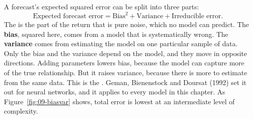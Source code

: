 A forecast's expected squared error can be split into three parts:
\begin{equation}
  \text{Expected forecast error} = \text{Bias}^2 + \text{Variance} + \text{Irreducible error}.
  \label{eq:20-biasvar}
\end{equation}
The  is the part of the return that is pure noise, which no model can predict. The \textbf{bias}, squared here, comes from a model that is systematically wrong. The \textbf{variance} comes from estimating the model on one particular sample of data. Only the bias and the variance depend on the model, and they move in opposite directions. Adding parameters lowers bias, because the model can capture more of the true relationship. But it raises variance, because there is more to estimate from the same data. This is the . Geman, Bienenstock and Doursat (1992) set it out for neural networks, and it applies to every model in this chapter. As Figure~\ref{fig:09-biasvar} shows, total error is lowest at an intermediate level of complexity.


